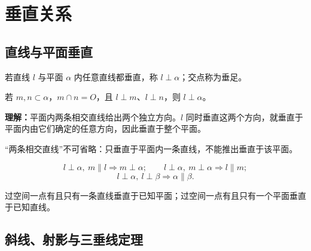 \section{垂直关系}

\subsection{直线与平面垂直}

若直线 $l$ 与平面 $\alpha$ 内任意直线都垂直，称 $l\perp\alpha$；交点称为垂足。

\begin{lawbox}[线面垂直的判定]
  若 $m,n\subset\alpha$，$m\cap n=O$，且 $l\perp m$、$l\perp n$，则 $l\perp\alpha$。
\end{lawbox}

\textbf{理解：}平面内两条相交直线给出两个独立方向。$l$ 同时垂直这两个方向，就垂直于平面内由它们确定的任意方向，因此垂直于整个平面。

“两条相交直线”不可省略：只垂直于平面内一条直线，不能推出垂直于该平面。

\begin{corollarybox}[垂直关系的平行传递]
  \[
    l\perp\alpha,\ m\parallel l\Rightarrow m\perp\alpha;\qquad
    l\perp\alpha,\ m\perp\alpha\Rightarrow l\parallel m;
  \]
  \[
    l\perp\alpha,\ l\perp\beta\Rightarrow\alpha\parallel\beta.
  \]
  \begin{center}
  \end{center}
\end{corollarybox}

\begin{corollarybox}[垂线与垂面的唯一性]
  过空间一点有且只有一条直线垂直于已知平面；过空间一点有且只有一个平面垂直于已知直线。
\end{corollarybox}

\subsection{斜线、射影与三垂线定理}

